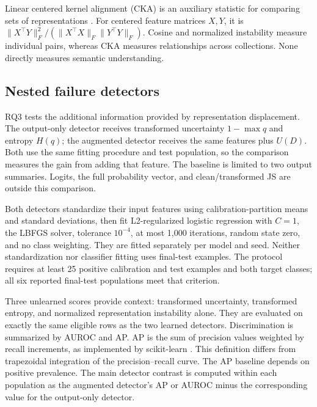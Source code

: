 Linear centered kernel alignment (CKA) is an auxiliary statistic for comparing sets of representations \cite{cka}. For centered feature matrices \(X,Y\), it is \(\lVert X^\top Y\rVert_F^2/(\lVert X^\top X\rVert_F\lVert Y^\top Y\rVert_F)\). Cosine and normalized instability measure individual pairs, whereas CKA measures relationships across collections. None directly measures semantic understanding.

\subsection{Nested failure detectors}

RQ3 tests the additional information provided by representation displacement. The output-only detector receives transformed uncertainty \(1-\max q\) and entropy \(H(q)\); the augmented detector receives the same features plus \(U(D)\). Both use the same fitting procedure and test population, so the comparison measures the gain from adding that feature. The baseline is limited to two output summaries. Logits, the full probability vector, and clean/transformed JS are outside this comparison.

Both detectors standardize their input features using calibration-partition means and standard deviations, then fit L2-regularized logistic regression with \(C=1\), the LBFGS solver, tolerance \(10^{-4}\), at most 1,000 iterations, random state zero, and no class weighting. They are fitted separately per model and seed. Neither standardization nor classifier fitting uses final-test examples. The protocol requires at least 25 positive calibration and test examples and both target classes; all six reported final-test populations meet that criterion.

Three unlearned scores provide context: transformed uncertainty, transformed entropy, and normalized representation instability alone. They are evaluated on exactly the same eligible rows as the two learned detectors. Discrimination is summarized by AUROC and AP. AP is the sum of precision values weighted by recall increments, as implemented by scikit-learn \cite{ap}. This definition differs from trapezoidal integration of the precision--recall curve. The AP baseline depends on positive prevalence. The main detector contrast is computed within each population as the augmented detector's AP or AUROC minus the corresponding value for the output-only detector.
